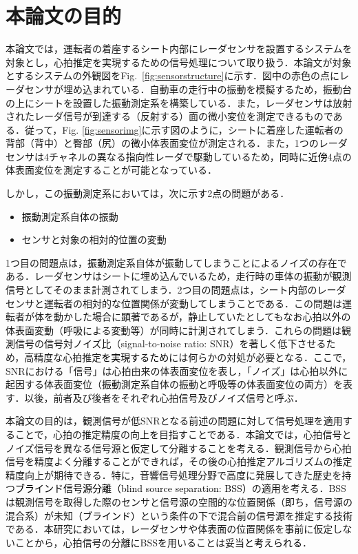 \section{本論文の目的}
本論文では，運転者の着座するシート内部にレーダセンサを設置するシステムを対象とし，心拍推定を実現するための信号処理について取り扱う．本論文が対象とするシステムの外観図をFig.~\ref{fig:sensorstructure}に示す．図中の赤色の点にレーダセンサが埋め込まれている．自動車の走行中の振動を模擬するため，振動台の上にシートを設置した振動測定系を構築している．また，レーダセンサは放射されたレーダ信号が到達する（反射する）面の微小変位を測定できるものである．従って，Fig. \ref{fig:sensorimg}に示す図のように，シートに着座した運転者の背部（背中）と臀部（尻）の\textcolor{black}{微小}体表面変位が測定される．また，1つのレーダセンサは4チャネルの異なる指向性レーダで駆動しているため，同時に\textcolor{black}{近傍}4点の体表面変位を測定することが可能となっている．

しかし，この\textcolor{black}{振動}測定系においては，次に示す2点の問題がある．
\begin{itemize}
	\item \textcolor{black}{振動}測定系自体の振動
	\item センサと対象の相対的位置の変動
\end{itemize}
1つ目の問題点は，\textcolor{black}{振動}測定系自体が振動してしまうことによるノイズの存在である．レーダセンサはシートに埋め込んでいるため，走行時の車体の振動が観測信号としてそのまま計測されてしまう．2つ目の問題点は，シート内部のレーダセンサと運転者の相対的な位置関係が変動してしまうことである．この問題は運転者が体を動かした場合に顕著であるが，静止していたとしてもなお心拍以外の体表面変動（呼吸による変動等）が同時に計測されてしまう．これらの問題は観測信号の信号対ノイズ比（signal-to-noise ratio: SNR）を著しく低下させるため，高精度な心拍推定\textcolor{black}{を実現するため}には何らかの対処が必要となる．ここで，SNRにおける「信号」は心拍由来の体表面変位を表し，「ノイズ」は心拍以外に起因する体表面変位（\textcolor{black}{振動}測定系自体の振動と呼吸等の体表面変位の両方）を表す．以後，前者及び後者をそれぞれ心拍信号及びノイズ信号と呼ぶ．

本論文の目的は，観測信号が低SNRとなる前述の問題に対して信号処理を適用することで，心拍の推定精度の向上を目指すことである．本論文では，心拍信号とノイズ信号を異なる信号源と仮定して分離することを考える．観測信号から心拍信号を精度よく分離することができれば，その後の心拍推定アルゴリズムの推定精度向上が期待できる．特に，音響信号処理分野で高度に発展してきた歴史を持つ\textcolor{black}{ブラインド信号源分離（blind source separation: BSS）}\cite{originica, ica2}の適用を考える．BSSは観測信号を取得した際のセンサと信号源の空間的な位置関係（即ち，信号源の混合系）が未知\textcolor{black}{（ブラインド）}という条件の下で混合前の信号源を推定する技術である．本研究においては，レーダセンサや体表面の位置関係を事前に仮定しないことから，心拍信号の分離にBSSを用いることは妥当\textcolor{black}{と考えられる}．

